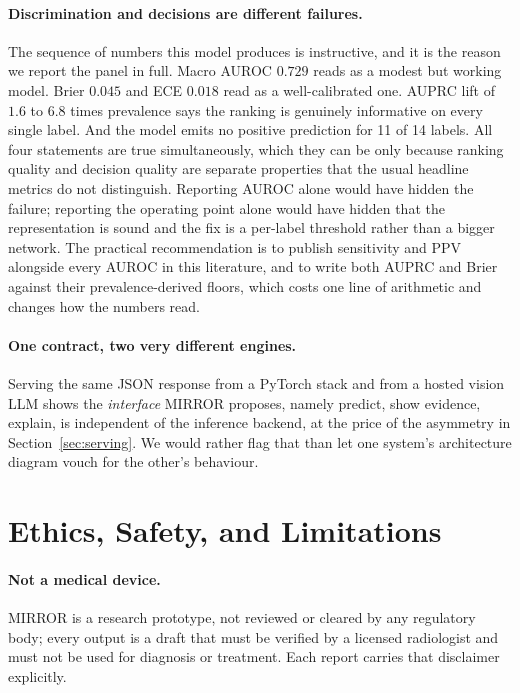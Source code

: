 \documentclass[10pt,twocolumn]{article}
\begin{document}
\paragraph{Discrimination and decisions are different failures.} The sequence of
numbers this model produces is instructive, and it is the reason we report the
panel in full. Macro AUROC $0.729$ reads as a modest but working model. Brier
$0.045$ and ECE $0.018$ read as a well-calibrated one. AUPRC lift of $1.6$ to
$6.8$ times prevalence says the ranking is genuinely informative on every single
label. And the model emits no positive prediction for 11 of 14 labels. All four
statements are true simultaneously, which they can be only because ranking quality
and decision quality are separate properties that the usual headline metrics do
not distinguish. Reporting AUROC alone would have hidden the failure; reporting
the operating point alone would have hidden that the representation is sound and
the fix is a per-label threshold rather than a bigger network. The practical
recommendation is to publish sensitivity and PPV alongside every AUROC in this
literature, and to write both AUPRC and Brier against their prevalence-derived
floors, which costs one line of arithmetic and changes how the numbers read.

\paragraph{One contract, two very different engines.} Serving the same JSON
response from a PyTorch stack and from a hosted vision LLM shows the
\emph{interface} MIRROR proposes, namely predict, show evidence, explain, is
independent of the inference backend, at the price of the asymmetry in
Section~\ref{sec:serving}. We would rather flag that than let one system's
architecture diagram vouch for the other's behaviour.

\section{Ethics, Safety, and Limitations}
\label{sec:ethics}

\paragraph{Not a medical device.} MIRROR is a research prototype, not reviewed or
cleared by any regulatory body; every output is a draft that must be verified by a
licensed radiologist and must not be used for diagnosis or treatment. Each report
carries that disclaimer explicitly.
\end{document}
